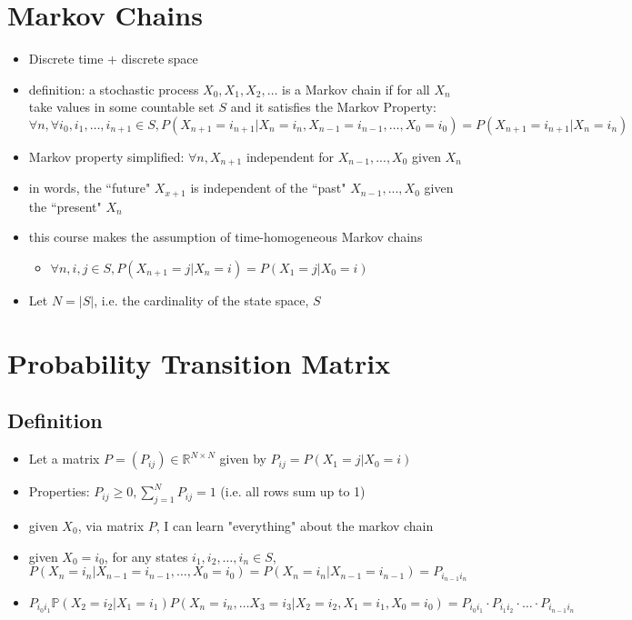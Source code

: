 \documentclass{article}
\begin{document}
\section{Markov Chains} 
\begin{itemize} 
    \item Discrete time + discrete space
    \item definition: a stochastic process $X_0, X_1, X_2, \ldots$ is a Markov
        chain if for all $X_n$ take values in some countable set $S$ and it satisfies the Markov Property: $\forall n, \forall i_0, i_1, \ldots, i_{n+1} \in S, P(X_{n+1} = i_{n+1} | X_n = i_n, X_{n-1} = i_{n-1}, \ldots, X_0 = i_0) = P(X_{n+1} = i_{n+1} | X_n = i_n)$
    \item Markov property simplified: $\forall n, X_{n+1}$ independent for $X_{n-1},...,X_{0}$ given $X_n$
    \item in words, the ``future" $X_{x+1}$ is independent of the ``past" $X_{n-1},...,X_0$ given the ``present" $X_n$
    \item this course makes the assumption of time-homogeneous Markov chains
    \begin{itemize}
        \item $\forall n, i,j \in S, P(X_{n+1}=j | X_n=i)=P(X_1=j|X_0=i)$
    \end{itemize}
\item Let $N=|S|$, i.e. the cardinality of the state space, $S$
\end{itemize}

\section{Probability Transition Matrix}
\subsection{Definition}
\begin{itemize}
    \item Let a matrix $P=(P_{ij})\in \mathbb{R}^{N \times N}$ given by $P_{ij}=P(X_1=j|X_0=i)$ 
    \item Properties: $P_{ij} \geq 0, \sum_{j=1}^{N} P_{ij}=1$ (i.e. all rows sum up to 1)
    \item given $X_0$, via matrix $P$, I can learn "everything" about the markov chain
    \item given $X_0=i_0$, for any states $i_1, i_2, \ldots, i_n \in S$, $P(X_n=i_n|X_{n-1}=i_{n-1}, \ldots, X_0=i_0)=P(X_n=i_n|X_{n-1}=i_{n-1})=P_{i_{n-1}i_n}$
    \item $P_{i_0 i_1} \mathbb{P}(X_2=i_2|X_1=i_1)P(X_n=i_n,\ldots X_3=i_3 | X_2=i_2, X_1=i_1, X_0=i_0)=P_{i_0 i_1}\cdot P_{i_1 i_2}\cdot \ldots \cdot P_{i_{n-1} i_n}$
\end{itemize}
\end{document}
